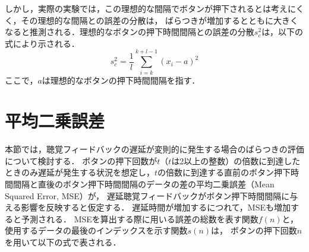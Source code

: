 \documentclass{article} %
\begin{document}
しかし，実際の実験では，この理想的な間隔でボタンが押下されるとは考えにくく，その理想的な間隔との誤差の分散は，
ばらつきが増加するとともに大きくなると推測される．理想的なボタンの押下時間間隔との誤差の分散$s^2_{c}$は，以下の式により示される．
\begin{equation}
  s^2_c = \frac{1}{l} \sum_{i=k}^{k+l-1} (x_i - a)^2
\end{equation}
ここで，$a$は理想的なボタンの押下時間間隔を指す．
\section{平均二乗誤差}
本節では，聴覚フィードバックの遅延が変則的に発生する場合のばらつきの評価について検討する．
ボタンの押下回数が$t$（$t$は2以上の整数）の倍数に到達したときのみ遅延が発生する状況を想定し，$t$の倍数に到達する直前のボタン押下時間間隔と直後のボタン押下時間間隔のデータの差の平均二乗誤差（Mean Squared Error, MSE）が，
遅延聴覚フィードバックがボタン押下時間間隔に与える影響を反映すると仮定する．
遅延時間が増加するにつれて，MSEも増加すると予測される．
MSEを算出する際に用いる誤差の総数を表す関数$f(n)$と，使用するデータの最後のインデックスを示す関数$s(n)$は，
ボタンの押下回数$n$を用いて以下の式で表される．
\end{document}
